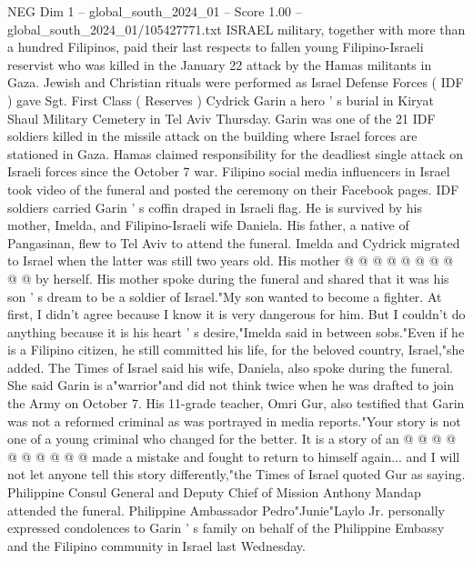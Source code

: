 \begin{textsample}{NEG Dim 1 – global\_south\_2024\_01 – Score 1.00 – global\_south\_2024\_01/105427771.txt}  \label{ex:f1_neg_337}
ISRAEL military, together with more than a hundred Filipinos, paid their last respects to fallen young Filipino-Israeli reservist who was killed in the January 22 attack by the Hamas militants in Gaza.
Jewish and Christian rituals were performed as Israel Defense Forces ( IDF ) gave Sgt.
First Class ( Reserves ) Cydrick Garin a hero ' s burial in Kiryat Shaul Military Cemetery in Tel Aviv Thursday.
Garin was one of the 21 IDF soldiers killed in the missile attack on the building where Israel forces are stationed in Gaza.
Hamas claimed responsibility for the deadliest single attack on Israeli forces since the October 7 war.
Filipino social media influencers in Israel took video of the funeral and posted the ceremony on their Facebook pages.
IDF soldiers carried Garin ' s coffin draped in Israeli flag.
He is survived by his mother, Imelda, and Filipino-Israeli wife Daniela.
His father, a native of Pangasinan, flew to Tel Aviv to attend the funeral.
Imelda and Cydrick migrated to Israel when the latter was still two years old.
His mother @ @ @ @ @ @ @ @ @ @ by herself.
His mother spoke during the funeral and shared that it was his son ' s dream to be a soldier of Israel."My son wanted to become a fighter.
At first, I didn't agree because I know it is very dangerous for him.
But I couldn't do anything because it is his heart ' s desire,"Imelda said in between sobs."Even if he is a Filipino citizen, he still committed his life, for the beloved country, Israel,"she added.
The Times of Israel said his wife, Daniela, also spoke during the funeral.
She said Garin is a"warrior"and did not think twice when he was drafted to join the Army on October 7.
His 11-grade teacher, Omri Gur, also testified that Garin was not a reformed criminal as was portrayed in media reports."Your story is not one of a young criminal who changed for the better.
It is a story of an @ @ @ @ @ @ @ @ @ @ made a mistake and fought to return to himself again... and I will not let anyone tell this story differently,"the Times of Israel quoted Gur as saying.
Philippine Consul General and Deputy Chief of Mission Anthony Mandap attended the funeral.
Philippine Ambassador Pedro"Junie"Laylo Jr. personally expressed condolences to Garin ' s family on behalf of the Philippine Embassy and the Filipino community in Israel last Wednesday.

\end{textsample}
